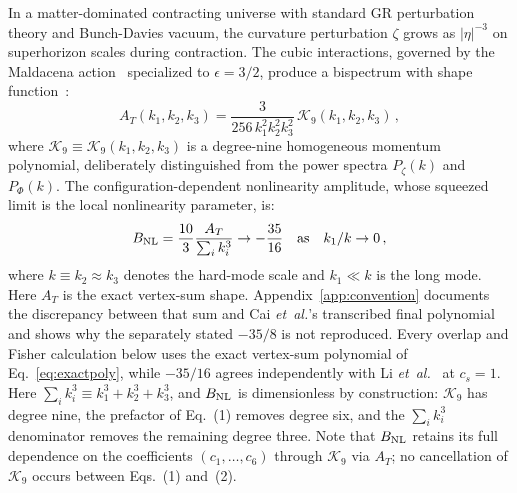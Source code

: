 \documentclass[aps,prd,twocolumn,superscriptaddress,showpacs,preprintnumbers,nofootinbib,longbibliography,floatfix]{revtex4-2}
\newcommand{\BNL}{B_{\rm NL}}
\newcommand{\etal}{\textit{et~al.}}
\begin{document}
In a matter-dominated contracting universe with standard GR perturbation theory and Bunch-Davies vacuum, the curvature perturbation $\zeta$ grows as $|\eta|^{-3}$ on superhorizon scales during contraction. The cubic interactions, governed by the Maldacena action~\cite{Maldacena:2002vr} specialized to $\epsilon = 3/2$, produce a bispectrum with shape function~\cite{Cai:2009fn}:
\begin{equation}
A_T(k_1, k_2, k_3) = \frac{3}{256\, k_1^2 k_2^2 k_3^2}\, \mathcal{K}_9(k_1, k_2, k_3)\,,
\end{equation}
where $\mathcal{K}_9\equiv\mathcal{K}_9(k_1,k_2,k_3)$ is a degree-nine homogeneous momentum polynomial, deliberately distinguished from the power spectra $P_\zeta(k)$ and $P_\Phi(k)$. The configuration-dependent nonlinearity amplitude, whose squeezed limit is the local nonlinearity parameter, is:
\begin{equation}
\BNL = \frac{10}{3}\frac{A_T}{\sum_i k_i^3} \to -\frac{35}{16}\quad\text{as}\quad k_1/k \to 0\,,
\label{eq:squeezed}
\end{equation}
where $k \equiv k_2 \approx k_3$ denotes the hard-mode scale and $k_1 \ll k$ is the long mode. Here $A_T$ is the exact vertex-sum shape. Appendix~\ref{app:convention} documents the discrepancy between that sum and Cai \etal's transcribed final polynomial and shows why the separately stated $-35/8$ is not reproduced. Every overlap and Fisher calculation below uses the exact vertex-sum polynomial of Eq.~\eqref{eq:exactpoly}, while $-35/16$ agrees independently with Li \etal~\cite{LiQuintin:2017} at $c_s=1$.
Here $\sum_i k_i^3 \equiv k_1^3 + k_2^3 + k_3^3$, and $\BNL$ is dimensionless by construction: $\mathcal{K}_9$ has degree nine, the prefactor of Eq.~(1) removes degree six, and the $\sum_i k_i^3$ denominator removes the remaining degree three. Note that $\BNL$ retains its full dependence on the coefficients $(c_1,\ldots,c_6)$ through $\mathcal{K}_9$ via $A_T$; no cancellation of $\mathcal{K}_9$ occurs between Eqs.~(1) and~(2).
\end{document}
